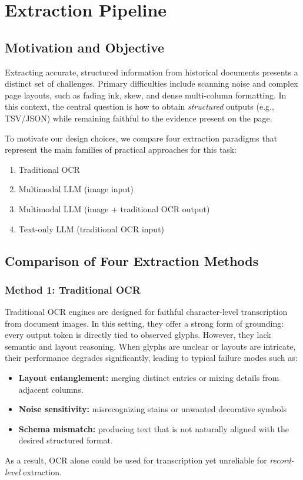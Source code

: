 \chapter{Extraction Pipeline}

\section{Motivation and Objective}
Extracting accurate, structured information from historical documents presents a distinct set of challenges. Primary difficulties include scanning noise and complex page layouts, such as fading ink, skew, and dense multi-column formatting. In this context, the central question is how to obtain \emph{structured} outputs (e.g., TSV/JSON) while remaining faithful to the evidence present on the page.

To motivate our design choices, we compare four extraction paradigms that represent the main families of practical approaches for this task:
\begin{enumerate}
    \item Traditional OCR
    \item Multimodal LLM (image input)
    \item Multimodal LLM (image + traditional OCR output)
    \item Text-only LLM (traditional OCR input)
\end{enumerate}

\section{Comparison of Four Extraction Methods}
\subsection{Method 1: Traditional OCR}
Traditional OCR engines are designed for faithful character-level transcription from document images. In this setting, they offer a strong form of grounding: every output token is directly tied to observed glyphs.
However, they lack semantic and layout reasoning. When glyphs are unclear or layouts are intricate, their performance degrades significantly, leading to typical failure modes such as:
\begin{itemize}
    \item \textbf{Layout entanglement:} merging distinct entries or mixing details from adjacent columns.
    \item \textbf{Noise sensitivity:} misrecognizing stains or unwanted decorative symbols
    \item \textbf{Schema mismatch:} producing text that is not naturally aligned with the desired structured format.
\end{itemize}
As a result, OCR alone could be used for transcription yet unreliable for \emph{record-level} extraction.

